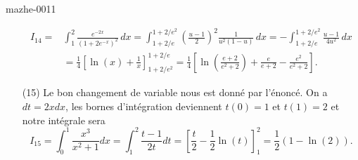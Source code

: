 \begin{corrige}{mazhe-0011}
\begin{enumerate}
      \begin{equation*}
        \begin{aligned}
          I_{14}=&\int_1^2\frac{  e^{-2x} }{ (1+2 e^{-x})^2 }\,dx = \int_{1+2/e}^{1+2/e^2}\left(\frac{u-1 }{ 2 }\right)^2\frac{1}{u^2(1-u)}\,dx = -\int_{1+2/e}^{1+2/e^2}\frac{u-1 }{4u^2}\,dx\\
          &= \frac{1}{4}\left[\ln(x)+\frac{1}{x}\right]_{1+2/e^2}^{1+2/e} = \frac{1}{4}\left[\ln\left(\frac{e+2}{e^2+2}\right)+\frac{e}{e+2}-\frac{e^2}{e^2+2}\right].
        \end{aligned}
      \end{equation*}
    \item[(15)]  Le bon changement de variable nous est donné par l'énoncé. On a $ dt= 2xdx$, les bornes d'intégration deviennent $t(0) = 1$ et $t(1) = 2$ et notre intégrale sera 
      \[
      I_{15}=\int_0^1\frac{ x^3 }{ x^2+1 }dx =\int_1^2\frac{ t-1 }{ 2t }dt = \left[\frac{t}{2} -\frac{1}{2}\ln(t)\right]_1^2  = \frac{1}{2}\left(1-\ln(2)\right).
      \]
  \end{enumerate}
\end{corrige}
